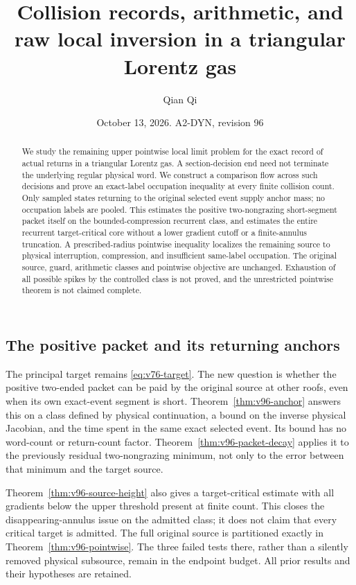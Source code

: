 \documentclass[11pt,reqno]{amsart}
\title[Collision records and raw local inversion]{Collision records, arithmetic, and raw local inversion in a triangular Lorentz gas}
\author{Qian Qi}
\date{October 13, 2026. A2-DYN, revision 96}
\numberwithin{equation}{section}
\theoremstyle{definition}
\theoremstyle{remark}\newtheorem{remark}[theorem]{Remark}
\begin{document}
\raggedbottom
\begin{abstract}
We study the remaining upper pointwise local limit problem for the exact
record of actual returns in a triangular Lorentz gas. A section-decision
end need not terminate the underlying regular physical word. We construct
a comparison flow across such decisions and prove an exact-label
occupation inequality at every finite collision count. Only sampled
states returning to the original selected event supply anchor mass;
no occupation labels are pooled. This estimates the positive two-nongrazing
short-segment packet itself on the bounded-compression recurrent class,
and estimates the entire recurrent target-critical core without a lower
gradient cutoff or a finite-annulus truncation. A prescribed-radius
pointwise inequality localizes the remaining source to physical
interruption, compression, and insufficient same-label occupation.
The original source, guard, arithmetic classes and pointwise objective
are unchanged. Exhaustion of all possible spikes by the controlled
class is not proved, and the unrestricted pointwise theorem is not
claimed complete.
\end{abstract}
\maketitle


\subsection{The positive packet and its returning anchors}
The principal target remains \eqref{eq:v76-target}. The new question is
whether the positive two-ended packet can be paid by the original
source at other roofs, even when its own exact-event segment is short.
Theorem~\ref{thm:v96-anchor} answers this on a class defined by physical
continuation, a bound on the inverse physical Jacobian, and the time
spent in the same exact selected event. Its bound has no word-count or
return-count factor. Theorem~\ref{thm:v96-packet-decay} applies it to
the previously residual two-nongrazing minimum, not only to the error
between that minimum and the target source.

Theorem~\ref{thm:v96-source-height} also gives a target-critical estimate
with all gradients below the upper threshold present at finite count.
This closes the disappearing-annulus issue on the admitted class;
it does not claim that every critical target is admitted. The full
original source is partitioned exactly in
Theorem~\ref{thm:v96-pointwise}. The three failed tests there, rather
than a silently removed physical subsource, remain in the endpoint
budget. All prior results and their hypotheses are retained.






\appendix


\end{document}
